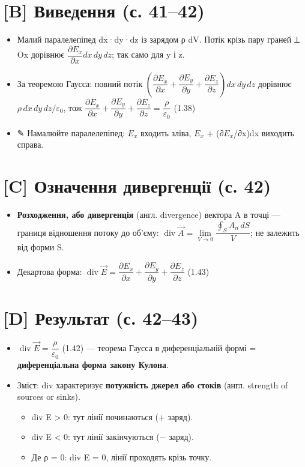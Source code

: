 \documentclass[11pt,a4paper,oneside]{book}
\newcommand{\pen}{{\sffamily\color{accent}✎}}
\begin{document}
\section*{[B] Виведення (с. 41–42)}
\begin{itemize}
\item Малий паралелепіпед dx·dy·dz із зарядом ρ dV. Потік крізь пару граней ⟂ Ox дорівнює $\dfrac{\partial E_x}{\partial x}dx\,dy\,dz$; так само для y і z.
\item За теоремою Гаусса: повний потік $\left(\dfrac{\partial E_x}{\partial x}+\dfrac{\partial E_y}{\partial y}+\dfrac{\partial E_z}{\partial z}\right)dx\,dy\,dz$ дорівнює $\rho\,dx\,dy\,dz/\varepsilon_0$, тож $\dfrac{\partial E_x}{\partial x}+\dfrac{\partial E_y}{\partial y}+\dfrac{\partial E_z}{\partial z} = \dfrac{\rho}{\varepsilon_0}$ (1.38)
\item \pen{} Намалюйте паралелепіпед: $E_{x}$ входить зліва, $E_{x}$ + (∂$E_{x}$/∂x)dx виходить справа.
\end{itemize}

\section*{[C] Означення дивергенції (с. 42)}
\begin{itemize}
\item \textbf{Розходження, або дивергенція} (англ. divergence) вектора A в точці — границя відношення потоку до об'єму:
$\operatorname{div}\vec A = \lim\limits_{V\to0}\dfrac{\oint_S A_n\,dS}{V}$; не залежить від форми S.
\item Декартова форма: $\operatorname{div}\vec E = \dfrac{\partial E_x}{\partial x}+\dfrac{\partial E_y}{\partial y}+\dfrac{\partial E_z}{\partial z}$ (1.43)
\end{itemize}

\section*{[D] Результат (с. 42–43)}
\begin{itemize}
\item $\operatorname{div}\vec E = \dfrac{\rho}{\varepsilon_0}$ (1.42) — теорема Гаусса в диференціальній формі = \textbf{диференціальна форма закону Кулона}.
\item Зміст: div характеризує \textbf{потужність джерел або стоків} (англ. strength of sources or sinks).
\begin{itemize}
\item div E > 0: тут лінії починаються (+ заряд).
\item div E < 0: тут лінії закінчуються (− заряд).
\item Де ρ = 0: div E = 0, лінії проходять крізь точку.
\end{itemize}
\end{itemize}
\end{document}
